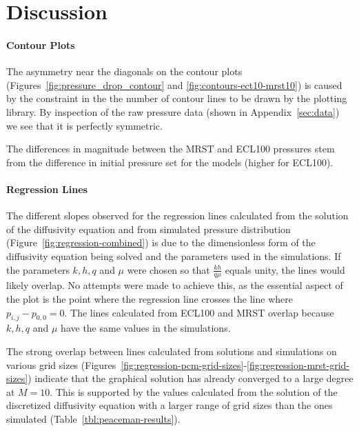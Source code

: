 \section{Discussion} %
\label{sec:discussion}

\paragraph{Contour Plots} %
\label{par:contour_plots}
The asymmetry near the diagonals on the contour plots (Figures~\ref{fig:pressure_drop_contour} and \ref{fig:contours-ect10-mrst10}) is caused by the constraint in the the number of contour lines to be drawn by the plotting library. By inspection of the raw pressure data (shown in Appendix~\ref{sec:data}) we see that it is perfectly symmetric.

The differences in magnitude between the MRST and ECL100 pressures stem from the difference in initial pressure set for the models (higher for ECL100). 

\paragraph{Regression Lines} %
\label{par:regression_lines}
The different slopes observed for the regression lines calculated from the solution of the diffusivity equation and from simulated pressure distribution (Figure~\ref{fig:regression-combined}) is due to the dimensionless form of the diffusivity equation being solved and the parameters used in the simulations. If the parameters $k,h,q$ and $\mu$ were chosen so that $\frac{kh}{q\mu}$ equals unity, the lines would likely overlap. No attempts were made to achieve this, as the essential aspect of the plot is the point where the regression line crosses the line where $p_{i,j}-p_{0,0}=0$. The lines calculated from ECL100 and MRST overlap because $k,h,q$ and $\mu$ have the same values in the simulations.

The strong overlap between lines calculated from solutions and simulations on various grid sizes (Figures~\ref{fig:regression-pcm-grid-sizes}-\ref{fig:regression-mrst-grid-sizes}) indicate that the graphical solution has already converged to a large degree at $M=10$. This is supported by the values calculated from the solution of the discretized diffusivity equation with a larger range of grid sizes than the ones simulated (Table~\ref{tbl:peaceman-results}).

